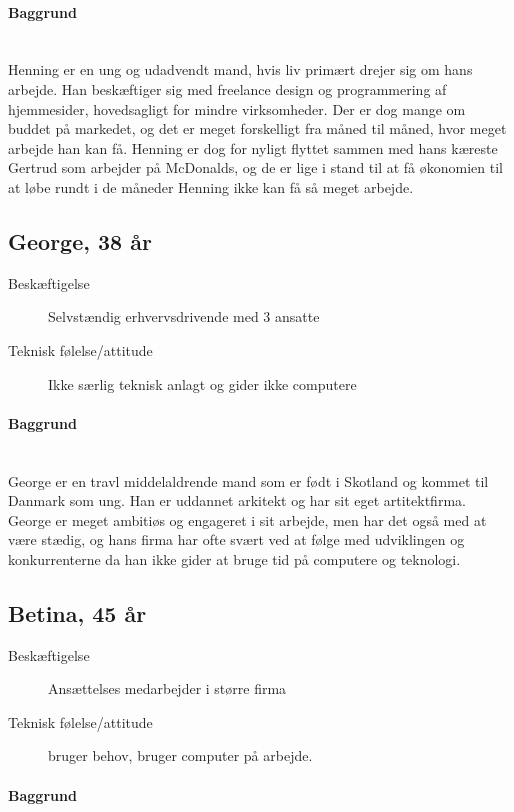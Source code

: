 \documentclass[a4paper,titlepage,fleqn,12pt]{article}
\begin{document}
\paragraph{Baggrund}\hfill\\Henning er en ung og udadvendt mand, hvis liv primært drejer sig om hans arbejde. Han beskæftiger sig med freelance design og programmering af hjemmesider, hovedsagligt for mindre virksomheder. Der er dog mange om buddet på markedet, og det er meget forskelligt fra måned til måned, hvor meget arbejde han kan få. Henning er dog for nyligt flyttet sammen med hans kæreste Gertrud som arbejder på McDonalds, og de er lige i stand til at få økonomien til at løbe rundt i de måneder Henning ikke kan få så meget arbejde.

\subsection{George, 38 år}
\begin{description}
	\item[Beskæftigelse] Selvstændig erhvervsdrivende med 3 ansatte
	\item[Teknisk følelse/attitude] Ikke særlig teknisk anlagt og gider ikke computere
\end{description}
\paragraph{Baggrund}\hfill\\
George er en travl middelaldrende mand som er født i Skotland og kommet til Danmark som ung. Han er uddannet arkitekt og har sit eget artitektfirma. George er meget ambitiøs og engageret i sit arbejde, men har det også med at være stædig, og hans firma har ofte svært ved at følge med udviklingen og konkurrenterne da han ikke gider at bruge tid på computere og teknologi. 

\subsection{Betina, 45 år}
\begin{description}
	\item[Beskæftigelse] Ansættelses medarbejder i større firma
	\item[Teknisk følelse/attitude] bruger behov, bruger computer på arbejde.
\end{description}
\paragraph{Baggrund}\hfill\\
\end{document}
